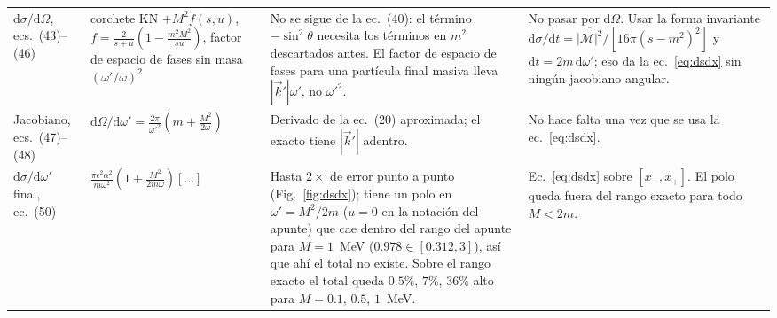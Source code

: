 \documentclass[11pt,a4paper]{article}
\newcommand{\eps}{\epsilon}
\newcommand{\dd}{\mathrm{d}}
\begin{document}
{\begin{longtable}{@{}p{2.3cm}p{4.2cm}p{3.9cm}p{4.6cm}@{}}
$\dd\sigma/\dd\Omega$, ecs.~(43)--(46) & corchete KN $+M^2 f(s,u)$, $f=\frac{2}{s+u}(1-\frac{m^2M^2}{su})$, factor de
espacio de fases sin masa $(\omega'/\omega)^2$ &
No se sigue de la ec.~(40): el término $-\sin^2\theta$ necesita los términos en $m^2$ descartados antes. El factor de
espacio de fases para una partícula final masiva lleva $|\vec k'|\omega'$, no $\omega'^2$. &
No pasar por $\dd\Omega$. Usar la forma invariante $\dd\sigma/\dd t=\overline{|\mathcal M|^2}/[16\pi(s-m^2)^2]$ y
$\dd t=2m\,\dd\omega'$; eso da la ec.~\eqref{eq:dsdx} sin ningún jacobiano angular.\\
Jacobiano, ecs.~(47)--(48) & $\dd\Omega/\dd\omega'=\frac{2\pi}{\omega'^2}(m+\frac{M^2}{2\omega})$ &
Derivado de la ec.~(20) aproximada; el exacto tiene $|\vec k'|$ adentro. & No hace falta una vez que se usa la
ec.~\eqref{eq:dsdx}.\\
$\dd\sigma/\dd\omega'$ final, ec.~(50) & $\frac{\pi\eps^2\alpha^2}{m\omega^2}(1+\frac{M^2}{2m\omega})[\ldots]$ &
Hasta $2\times$ de error punto a punto (Fig.~\ref{fig:dsdx}); tiene un polo en $\omega'=M^2/2m$ ($u=0$ en la notación
del apunte) que cae dentro del rango del apunte para $M=1$~MeV ($0.978\in[0.312,3]$), así que ahí el total no existe.
Sobre el rango exacto el total queda $0.5\%$, $7\%$, $36\%$ alto para $M=0.1$, $0.5$, $1$~MeV. &
Ec.~\eqref{eq:dsdx} sobre $[x_-,x_+]$. El polo queda fuera del rango exacto para todo $M<2m$.\\
\bottomrule
\end{longtable}}
\end{document}
